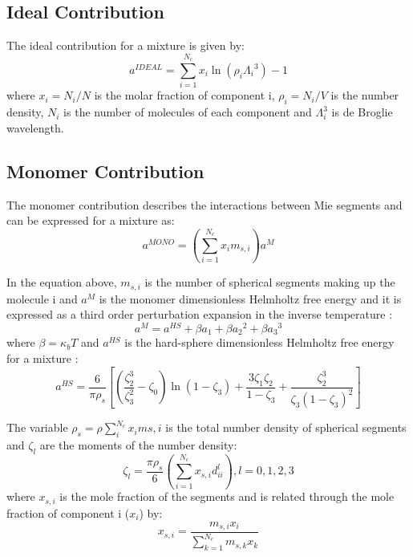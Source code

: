 \subsection{Ideal Contribution}

The ideal contribution for a mixture is given by:
\begin{equation}
a^{IDEAL} = \sum_{i=1}^{N_{c}} x_{i}\ln{(\rho_{i}{\Lambda_{i}}^3)} -1
\label{eqn:aideal}
\end{equation}
where $x_{i}=N_{i}/N$ is the molar fraction of component i, $\rho_{i}=N_{i}/V$ is the number density, $N_{i}$ is the number of molecules of each component and $\Lambda_{i}^3$ is de Broglie wavelength. 

\subsection{Monomer Contribution}

The monomer contribution describes the interactions between Mie segments and can be expressed for a mixture as:
\begin{equation}
a^{MONO} = \left(\sum_{i=1}^{N_{c}} x_{i}m_{s,i} \right)a^{M}
\label{eqn:amonomer}
\end{equation}

In the equation above, $m_{s,i}$ is the number of spherical segments making up the molecule i and $a^{M}$  is the monomer dimensionless Helmholtz free energy and it is expressed as a third order perturbation expansion in the inverse temperature \cite{bh1976}:
\begin{equation}
a^{M} = a^{HS}+\beta{a_{1}}+\beta{a_{2}}^2+\beta{a_{3}}^3 
\label{eqn:aM}
\end{equation}
where $\beta=\kappa_{b}T$ and $a^{HS}$ is the hard-sphere dimensionless Helmholtz free energy for a mixture :
\begin{equation}
a^{HS} = \frac{6}{\pi\rho_{s}}\left[\left(\frac{\zeta^3_2}{\zeta^2_3}-\zeta_0 \right)\ln(1-\zeta_3)+\frac{3\zeta_{1}\zeta_{2}}{1-\zeta_3}+ \frac{\zeta^3_2}{\zeta_{3}(1-\zeta_3)^2}\right]
\label{eqn:hs}
\end{equation}

The variable $\rho_{s}=\rho\sum_{i}^{N_c} x_{i}m{s,i}$ is the total number density of spherical segments and $\zeta_l$ are the moments of the number density:
\begin{equation}
\zeta_l = \frac{\pi\rho_s}{6}\left(\sum_{i=1}^{N_c} x_{s,i}d^l_{ii} \right), l = 0,1,2,3
\label{eqn:zetal}
\end{equation}
where $x_{s,i}$ is the mole fraction of the segments and is related through the mole fraction of component i ($x_i$) by:
\begin{equation}
x_{s,i} = \frac{m_{s,i}x_i}{\sum_{k=1}^{N_c} m_{s,k}x_{k} }
\label{eqn:xsi}
\end{equation}


